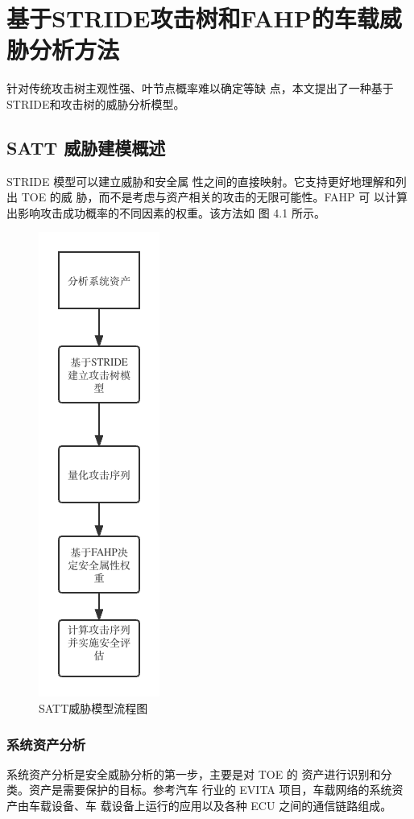 \chapter{基于STRIDE攻击树和FAHP的车载威胁分析方法}
\label{ch4}
针对传统攻击树主观性强、叶节点概率难以确定等缺
点，本文提出了一种基于STRIDE和攻击树的威胁分析模型。
\section{SATT 威胁建模概述}
STRIDE 模型可以建立威胁和安全属
性之间的直接映射。它支持更好地理解和列出 TOE 的威
胁，而不是考虑与资产相关的攻击的无限可能性。FAHP 可
以计算出影响攻击成功概率的不同因素的权重。该方法如
图 4.1 所示。
\begin{figure}
    \centering
    \includegraphics[scale=0.5]{resources/img/a13.png}
    \caption{SATT威胁模型流程图}
  \end{figure}
\subsection{系统资产分析}
系统资产分析是安全威胁分析的第一步，主要是对 TOE 的
资产进行识别和分类。资产是需要保护的目标。参考汽车
行业的 EVITA 项目，车载网络的系统资产由车载设备、车
载设备上运行的应用以及各种 ECU 之间的通信链路组成\cite{ruddle2009deliverable}。
